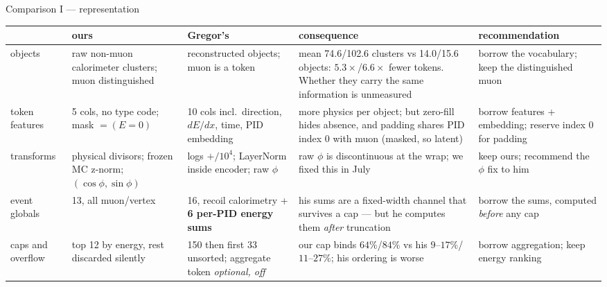 \documentclass[aspectratio=169,10pt]{beamer}
\newcommand{\ours}[1]{\textcolor{ours}{#1}}
\newcommand{\theirs}[1]{\textcolor{theirs}{#1}}
\newcommand{\warn}[1]{\textcolor{warn}{#1}}
\renewcommand{\arraystretch}{1.12}
\begin{document}
\begin{frame}{Comparison I --- representation}
  \begin{center}\scriptsize\renewcommand{\arraystretch}{0.98}
  \begin{tabular}{@{}R{0.135\textwidth}R{0.215\textwidth}R{0.215\textwidth}R{0.175\textwidth}R{0.175\textwidth}@{}}
    \toprule
    & \ours{\textbf{ours}} & \theirs{\textbf{Gregor's}} & \textbf{consequence} &
      \textbf{recommendation} \\
    \midrule
    objects &
      raw non-muon calorimeter clusters; muon distinguished &
      reconstructed objects; muon is a token &
      mean 74.6/102.6 clusters vs 14.0/15.6 objects: $5.3\times$/$6.6\times$ fewer
      tokens. \warn{Whether they carry the same information is unmeasured} &
      \theirs{borrow} the vocabulary; \ours{keep} the distinguished muon \\
    token features &
      5 cols, no type code; mask $=(E{=}0)$ &
      10 cols incl.\ direction, $dE/dx$, time, PID embedding &
      more physics per object; but zero-fill hides absence, and padding shares PID
      index 0 with muon (masked, so latent) &
      \theirs{borrow} features + embedding; \warn{reserve index 0 for padding} \\
    transforms &
      physical divisors; frozen MC z-norm; $(\cos\phi,\sin\phi)$ &
      logs $+/10^4$; LayerNorm inside encoder; \warn{raw $\phi$} &
      raw $\phi$ is discontinuous at the wrap; we fixed this in July &
      \ours{keep} ours; recommend the $\phi$ fix to him \\
    event globals &
      13, all muon/vertex &
      16, recoil calorimetry + \textbf{6 per-PID energy sums} &
      his sums are a fixed-width channel that survives a cap --- but he computes them
      \emph{after} truncation &
      \theirs{borrow} the sums, computed \emph{before} any cap \\
    caps and overflow &
      top 12 by energy, rest discarded silently &
      150 then first 33 unsorted; aggregate token \emph{optional, off} &
      our cap binds $64\%$/$84\%$ vs his $9$--$17\%$/$11$--$27\%$; his ordering is worse &
      \theirs{borrow} aggregation; \ours{keep} energy ranking \\
    \bottomrule
  \end{tabular}
  \end{center}
\end{frame}
\end{document}
